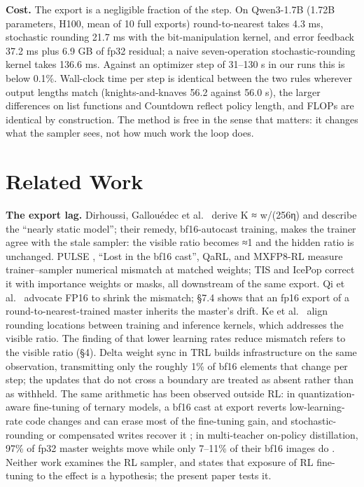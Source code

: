 \documentclass[
  10pt,
]{article}
\begin{document}
\textbf{Cost.} The export is a negligible fraction of the step. On Qwen3-1.7B (1.72B parameters,
H100, mean of 10 full exports) round-to-nearest takes 4.3 ms, stochastic rounding 21.7 ms with the
bit-manipulation kernel, and error feedback 37.2 ms plus 6.9 GB of fp32 residual; a naive
seven-operation stochastic-rounding kernel takes 136.6 ms. Against an optimizer step of 31--130 s in
our runs this is below 0.1\%. Wall-clock time per step is identical between the two rules wherever
output lengths match (knights-and-knaves 56.2 against 56.0 s), the larger differences on list
functions and Countdown reflect policy length, and FLOPs are identical by construction. The method
is free in the sense that matters: it changes what the sampler sees, not how much work the loop
does.

\section{Related Work}\label{related-work}

\textbf{The export lag.} Dirhoussi, Gallouédec et al.~\cite{r1} derive K ≈ \textbar w\textbar/(256η)
and describe the ``nearly static model''; their remedy, bf16-autocast training, makes the trainer
agree with the stale sampler: the visible ratio becomes ≈1 and the hidden ratio is unchanged. PULSE
\cite{r2}, ``Lost in the bf16 cast'', QaRL, and MXFP8-RL \cite{r5} measure trainer--sampler
numerical mismatch at matched weights; TIS \cite{r6} and IcePop \cite{r7} correct it with importance
weights or masks, all downstream of the same export. Qi et al.~\cite{r3} advocate FP16 to shrink the
mismatch; §7.4 shows that an fp16 export of a round-to-nearest-trained master inherits the master's
drift. Ke et al.~\cite{r4} align rounding locations between training and inference kernels, which
addresses the visible ratio. The finding of \cite{r8} that lower learning rates reduce mismatch
refers to the visible ratio (§4). Delta weight sync in TRL \cite{r25} builds infrastructure on the
same observation, transmitting only the roughly 1\% of bf16 elements that change per step; the
updates that do not cross a boundary are treated as absent rather than as withheld. The same
arithmetic has been observed outside RL: in quantization-aware fine-tuning of ternary models, a bf16
cast at export reverts low-learning-rate code changes and can erase most of the fine-tuning gain,
and stochastic-rounding or compensated writes recover it \cite{r26}; in multi-teacher on-policy
distillation, 97\% of fp32 master weights move while only 7--11\% of their bf16 images do
\cite{r27}. Neither work examines the RL sampler, and \cite{r26} states that exposure of RL
fine-tuning to the effect is a hypothesis; the present paper tests it.
\end{document}
